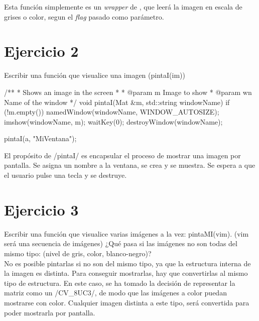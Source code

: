 \documentclass[	DIV=calc,%
							paper=a4,%
							fontsize=11pt]{scrartcl}	 					%
\newcommand{\miit}[1]{{\usefont{T1}{mdugm}{m}{it}\selectfont #1}}
\begin{document}
Esta función simplemente es un \textit{wrapper} de , que leerá la imagen en escala de grises o color, segun el \textit{flag} pasado como parámetro.

\section{Ejercicio 2}

\miit{Escribir una función que visualice una imagen (pintaI(im))}\\

\begin{cppcode}
/**
* Shows an image in the screen
*
* @param m Image to show
* @param wn Name of the window
*/
void pintaI(Mat &m, std::string windowName){
    if (!m.empty()){
        namedWindow(windowName, WINDOW_AUTOSIZE);
        imshow(windowName, m);
        waitKey(0);
        destroyWindow(windowName);
    }
}

pintaI(a, "MiVentana");
\end{cppcode}

El propósito de \cppinline/pintaI/ es encapsular el proceso de mostrar una imagen por pantalla. Se asigna un nombre a la ventana, se crea y se muestra. Se espera a que el usuario pulse una tecla y se destruye.

\section{Ejercicio 3}

\miit{Escribir una función que visualice varias imágenes a la vez:
pintaMI(vim). (vim será una secuencia de imágenes) ¿Qué pasa
si las imágenes no son todas del mismo tipo: (nivel de gris, color,
blanco-negro)?}\\

No es posible pintarlas si no son del mismo tipo, ya que la estructura interna de la imagen es distinta. Para conseguir mostrarlas, hay que convertirlas al mismo tipo de estructura. En este caso, se ha tomado la decisión de representar la matriz como un \cppinline/CV_8UC3/, de modo que las imágenes a color puedan mostrarse con color. Cualquier imagen distinta a este tipo, será convertida para poder mostrarla por pantalla.
\end{document}

